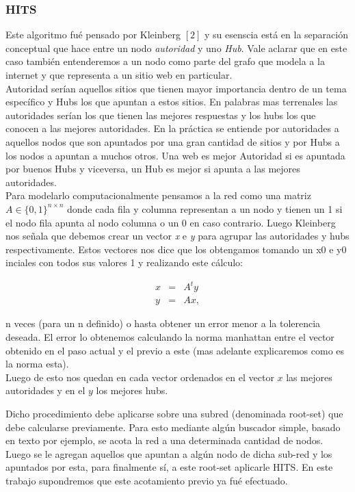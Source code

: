 \subsubsection{HITS}

Este algoritmo fué pensado por Kleinberg $[2]$ y su esenscia está en la separación conceptual que hace entre un nodo \textit{autoridad} y uno \textit{Hub}. Vale aclarar que en este caso también entenderemos a un nodo como parte del grafo que modela a la internet y que representa a un sitio web en particular. \\
Autoridad serían aquellos sitios que tienen mayor importancia dentro de un tema específico y Hubs los que apuntan a estos sitios. En palabras mas terrenales las autoridades serían los que tienen las mejores respuestas y los hubs los que conocen a las mejores autoridades.
En la práctica se entiende por autoridades a aquellos nodos que son apuntados por una gran cantidad de sitios y por Hubs a los nodos a apuntan a muchos otros. Una web es mejor Autoridad si es apuntada por buenos Hubs y viceversa, un Hub es mejor si apunta a las mejores autoridades.\\
Para modelarlo computacionalmente pensamos a la red como una matriz $A \in \{0,1\}^{n \times n}$ donde cada fila y columna representan a un nodo y tienen un 1 si el nodo fila apunta al nodo columna o un 0 en caso contrario. Luego Kleinberg nos señala que debemos crear un vector \textit{x} e \textit{y} para agrupar las autoridades y hubs respectivamente. Estos vectores nos dice que los obtengamos tomando un x0 e y0 inciales con todos sus valores 1 y realizando este cálculo:

\begin{eqnarray}
x & = & A^ty \label{eq:auth-update-math} \\
y & = & Ax, \label{eq:hub-update-math} 
\end{eqnarray}

n veces (para un n definido) o hasta obtener un error menor a la tolerencia deseada. El error lo obtenemos calculando la norma manhattan entre el vector obtenido en el paso actual y el previo a este (mas adelante explicaremos como es la norma esta).\\
Luego de esto nos quedan en cada vector ordenados en el vector $x$ las mejores autoridades y en el $y$ los mejores hubs.

Dicho procedimiento debe aplicarse sobre una subred (denominada root-set) que debe calcularse previamente. Para esto mediante algún buscador simple, basado en texto por ejemplo, se acota la red a una determinada cantidad de nodos. Luego se le agregan aquellos que apuntan a algún nodo de dicha sub-red y los apuntados por esta, para finalmente sí, a este root-set aplicarle HITS. En este trabajo supondremos que este acotamiento previo ya fué efectuado.


